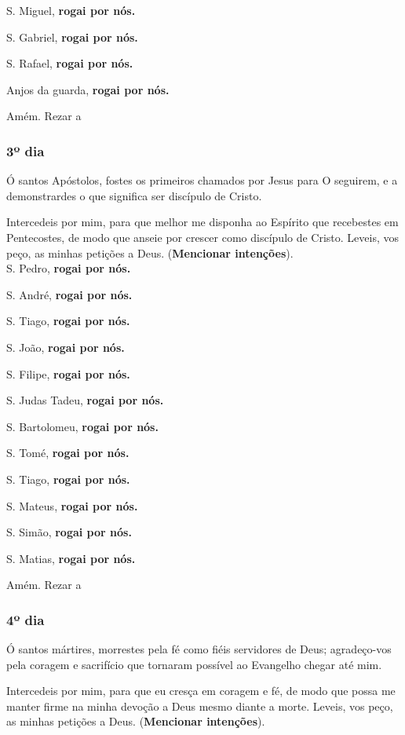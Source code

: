 \documentclass[a4paper,14pt]{extarticle} \usepackage[utf8]{inputenc}
\begin{document}
S. Miguel, \textbf{rogai por nós.}

S. Gabriel, \textbf{rogai por nós.}

S. Rafael, \textbf{rogai por nós.}

Anjos da guarda, \textbf{rogai por nós.}

Amém. Rezar a 
\subsubsection{3º dia}

Ó santos Apóstolos, fostes os primeiros chamados por Jesus para O seguirem, e a demonstrardes o que significa ser discípulo de Cristo.

Intercedeis por mim, para que melhor me disponha ao Espírito que recebestes em Pentecostes, de modo que anseie por crescer como discípulo de Cristo. Leveis, vos peço, as minhas petições a Deus. (\textbf{Mencionar intenções}).\\

S. Pedro, \textbf{rogai por nós.}

S. André, \textbf{rogai por nós.}

S. Tiago, \textbf{rogai por nós.}

S. João, \textbf{rogai por nós.}

S. Filipe, \textbf{rogai por nós.}

S. Judas Tadeu, \textbf{rogai por nós.}

S. Bartolomeu, \textbf{rogai por nós.}

S. Tomé, \textbf{rogai por nós.}

S. Tiago, \textbf{rogai por nós.}

S. Mateus, \textbf{rogai por nós.}

S. Simão, \textbf{rogai por nós.}

S. Matias, \textbf{rogai por nós.}

Amém. Rezar a 
\subsubsection{4º dia}

Ó santos mártires, morrestes pela fé como fiéis servidores de Deus; agradeço-vos pela coragem e sacrifício que tornaram possível ao Evangelho chegar até mim.

Intercedeis por mim, para que eu cresça em coragem e fé, de modo que possa me manter firme na minha devoção a Deus mesmo diante a morte. Leveis, vos peço, as minhas petições a Deus. (\textbf{Mencionar intenções}).\\
\end{document}
